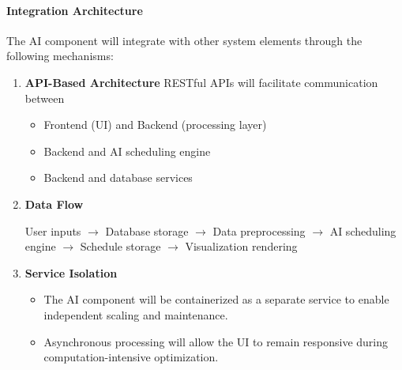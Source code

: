 \paragraph{Integration Architecture}

The AI component will integrate with other system elements through the following mechanisms:
\begin{enumerate}[label=\arabic*., nosep,leftmargin=*,topsep=2pt, partopsep=0pt, itemsep=1pt]
    \item \textbf{API-Based Architecture} 
    RESTful APIs will facilitate communication between
        \begin{itemize}[label=\textendash, nosep,leftmargin=*,topsep=1pt, partopsep=0pt, itemsep=0pt]
            \item Frontend (UI) and Backend (processing layer)
            \item Backend and AI scheduling engine
            \item Backend and database services
        \end{itemize}
    \item \textbf{Data Flow}
        
    User inputs $\rightarrow$ Database storage $\rightarrow$ Data preprocessing $\rightarrow$ AI scheduling engine $\rightarrow$ Schedule storage $\rightarrow$ Visualization rendering
    \item \textbf{Service Isolation}
        \begin{itemize}[label=\textendash, nosep,leftmargin=*,topsep=1pt, partopsep=0pt, itemsep=0pt]
            \item The AI component will be containerized as a separate service to enable independent scaling and maintenance.
            \item Asynchronous processing will allow the UI to remain responsive during computation-intensive optimization.
        \end{itemize}
\end{enumerate}

